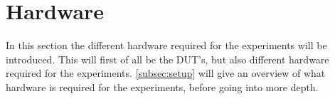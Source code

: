 \section{Hardware}\label{sec:hardware}



In this section the different hardware required for the experiments will be introduced. This will first of all be the DUT's, but also different hardware required for the experiments. \cref{subsec:setup} will give an overview of what hardware is required for the experiments, before going into more depth.



%
